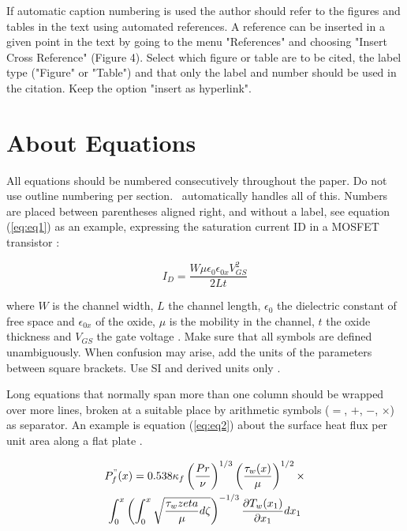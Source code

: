 \documentclass[10pt]{imeko_acta}
\begin{document}
If automatic caption numbering is used the author should refer to the figures and tables in the text using automated references. A reference can be inserted in a given point in the text by going to the menu "References" and choosing "Insert Cross Reference" (Figure 4). Select which figure or table are to be cited, the label type ("Figure" or "Table") and that only the label and number should be used in the citation. Keep the option "insert as hyperlink". 

\section{About Equations}

All equations should be numbered consecutively throughout the paper. Do not use outline numbering per section. \LaTeXe\ automatically handles all of this. Numbers are placed between parentheses aligned right, and without a label, see equation (\ref{eq:eq1}) as an example, expressing the saturation current ID in a MOSFET transistor \cite{Middelhoek1989}:

\begin{equation}\label{eq:eq1}
I_D = \frac{W \mu \epsilon_0 \epsilon_{0x} V^2_{GS}}{2Lt}
\end{equation}

where $W$ is the channel width, $L$ the channel length, $\epsilon_0$ the dielectric constant of free space and $\epsilon_{0x}$ of the oxide, $\mu$ is the mobility in the channel, $t$ the oxide thickness and $V_{GS}$ the gate voltage \cite{Middelhoek1989}. Make sure that all symbols are defined unambiguously. When confusion may arise, add the units of the parameters between square brackets. Use SI and derived units only \cite{Grattan1994}. 

Long equations that normally span more than one column should be wrapped over more lines, broken at a suitable place by arithmetic symbols ($=$, $+$, $-$, $\times$) as separator. An example is equation  (\ref{eq:eq2}) about the surface heat flux per unit area along a flat plate \cite{Lighthill1950}.

\begin{multline}\label{eq:eq2}
P^{"}_f(x) = 0.538\kappa_f \left(\frac{Pr}{\nu}\right)^{1/3}\left(\frac{\tau_w(x)}{\mu}\right)^{1/2} \times \\
\int_{0}^{x} \left(\int_{0}^{x}\sqrt{\frac{\tau_w{zeta}}{\mu}d\zeta} \right)^{-1/3} \frac{\partial T_w(x_1)}{\partial x_1}dx_1
\end{multline}
\end{document}
